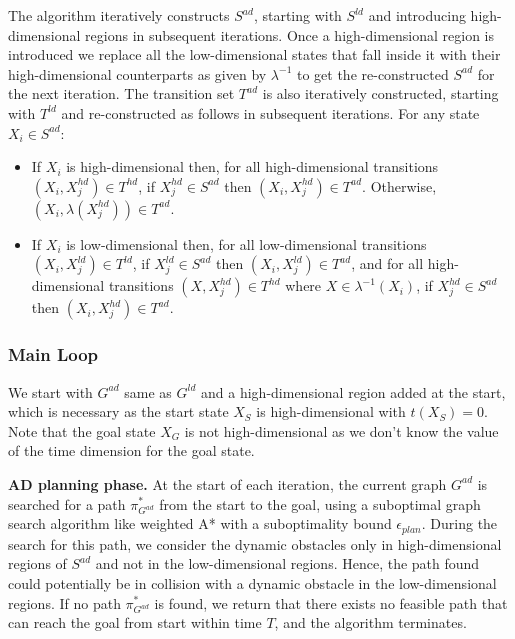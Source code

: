 The algorithm iteratively constructs $S^{ad}$, starting with $S^{ld}$ and introducing high-dimensional regions in subsequent iterations. Once a high-dimensional region is introduced we replace all the low-dimensional states that fall inside it with their high-dimensional counterparts as given by $\lambda^{-1}$ to get the re-constructed $S^{ad}$ for the next iteration. The transition set $T^{ad}$ is also iteratively constructed, starting with $T^{ld}$ and re-constructed as follows in subsequent iterations. 
For any state $X_i \in S^{ad}$:
\begin{itemize}
\item If $X_i$ is high-dimensional then, for all high-dimensional transitions $(X_i,X_j^{hd}) \in T^{hd}$, if $X_j^{hd} \in S^{ad}$ then $(X_i,X_j^{hd}) \in T^{ad}$. Otherwise, $(X_i, \lambda(X_j^{hd})) \in T^{ad}$.
\item If $X_i$ is low-dimensional then, for all low-dimensional transitions $(X_i, X_j^{ld}) \in T^{ld}$, if $X_j^{ld} \in S^{ad}$ then $(X_i, X_j^{ld}) \in T^{ad}$, and for all high-dimensional transitions $(X, X_j^{hd}) \in T^{hd}$ where $X \in \lambda^{-1}(X_i)$, if $X_j^{hd} \in S^{ad}$ then $(X_i, X_j^{hd}) \in T^{ad}$.
\end{itemize}

\subsubsection{Main Loop}
We start with $G^{ad}$ same as $G^{ld}$ and a high-dimensional region added at the start, which is necessary as the start state $X_S$ is high-dimensional with $t(X_S) = 0$. Note that the goal state $X_G$ is not high-dimensional as we don't know the value of the time dimension for the goal state. 

{\bf AD planning phase.} At the start of each iteration, the current graph $G^{ad}$ is searched for a path $\pi_{G^{ad}}^*$ from the start to the goal, using a suboptimal graph search algorithm like weighted A* with a suboptimality bound $\epsilon_{plan}$. During the search for this path, we consider the dynamic obstacles only in high-dimensional regions of $S^{ad}$ and not in the low-dimensional regions. Hence, the path found could potentially be in collision with a dynamic obstacle in the low-dimensional regions. If no path $\pi_{G^{ad}}^*$ is found, we return that there exists no feasible path that can reach the goal from start within time $T$, and the algorithm terminates.

